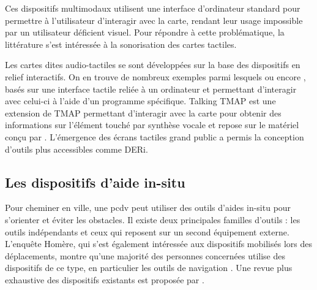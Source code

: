 Ces dispositifs multimodaux utilisent une interface d'ordinateur standard pour permettre à l'utilisateur d'interagir avec la carte, rendant leur usage impossible par un utilisateur déficient visuel. Pour répondre à cette problématique, la littérature s'est intéressée à la sonorisation des cartes tactiles.

\newpar{}


Les cartes dites audio-tactiles se sont développées sur la base des dispositifs en relief interactifs. On en trouve de nombreux exemples parmi lesquels \cite{Loetzsch1994} ou encore \cite{Landau2001}, basés sur une interface tactile reliée à un ordinateur et permettant d'interagir avec celui-ci à l'aide d'un programme spécifique.
Talking TMAP \cite{Miele2006} est une extension de TMAP \cite{Miele2004} permettant d'interagir avec la carte pour obtenir des informations sur l'élément touché par synthèse vocale et repose sur le matériel conçu par \cite{Landau2001}. L'émergence des écrans tactiles grand public a permis la conception d'outils plus accessibles \cite{Brock2015} comme DERi.

\subsection{Les dispositifs d'aide in-situ}

\label{ea_dispositifs_in_situ}


Pour cheminer en ville, une \gls{pcdv} peut utiliser des outils d'aides in-situ pour s'orienter et éviter les obstacles. Il existe deux principales familles d'outils : les outils indépendants et ceux qui reposent sur un second équipement externe. L'enquête Homère, qui s'est également intéressée aux dispositifs mobilisés lors des déplacements, montre qu'une majorité des personnes concernées utilise des dispositifs de ce type, en particulier les outils de navigation \cite{homere_2023}. Une revue plus exhaustive des dispositifs existants est proposée par \cite{Kuriakose2022}.

\newpar{}

